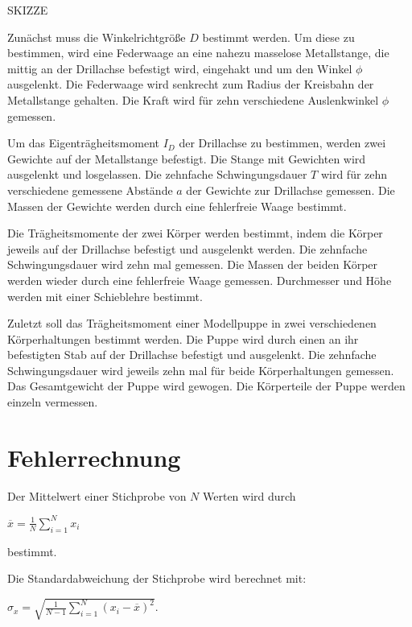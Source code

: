     SKIZZE

    Zunächst muss die Winkelrichtgröße $D$ bestimmt
    werden. Um diese zu bestimmen,
    wird eine Federwaage an eine nahezu masselose
    Metallstange, die mittig an der Drillachse befestigt wird, eingehakt und um den Winkel
    $\phi$ ausgelenkt. Die Federwaage wird senkrecht
    zum Radius der Kreisbahn der Metallstange
    gehalten. Die Kraft wird für zehn verschiedene
    Auslenkwinkel $\phi$ gemessen.

    Um das Eigenträgheitsmoment $I_D$ der Drillachse
    zu bestimmen, werden zwei Gewichte auf
    der Metallstange befestigt. Die Stange mit
    Gewichten wird ausgelenkt und losgelassen.
    Die zehnfache Schwingungsdauer $T$ wird für zehn verschiedene
    gemessene Abstände $a$ der Gewichte zur Drillachse gemessen.
    Die Massen der Gewichte werden durch eine
    fehlerfreie Waage bestimmt.

    Die Trägheitsmomente der zwei Körper werden
    bestimmt, indem die Körper jeweils auf der
    Drillachse befestigt und ausgelenkt werden.
    Die zehnfache Schwingungsdauer wird zehn mal gemessen.
    Die Massen der beiden Körper werden wieder
    durch eine fehlerfreie Waage gemessen.
    Durchmesser und Höhe werden mit einer Schieblehre
    bestimmt.

    Zuletzt soll das Trägheitsmoment einer
    Modellpuppe in zwei verschiedenen
    Körperhaltungen bestimmt werden.
    Die Puppe wird durch einen an ihr befestigten Stab auf der
    Drillachse befestigt und ausgelenkt. Die
    zehnfache Schwingungsdauer wird jeweils
    zehn mal für beide Körperhaltungen gemessen.
    Das Gesamtgewicht der Puppe wird gewogen.
    Die Körperteile der Puppe werden einzeln vermessen.

    \section{Fehlerrechnung}
    Der Mittelwert einer Stichprobe von $N$ Werten
    wird durch

    $\overline{x} = \frac{1}{N} \sum_{i=1}^N x_i$

    bestimmt.

    Die Standardabweichung der Stichprobe wird berechnet mit:

    $\sigma_x = \sqrt{\frac{1}{N-1} \sum_{i=1}^N (x_i - \overline{x})^2}$.

